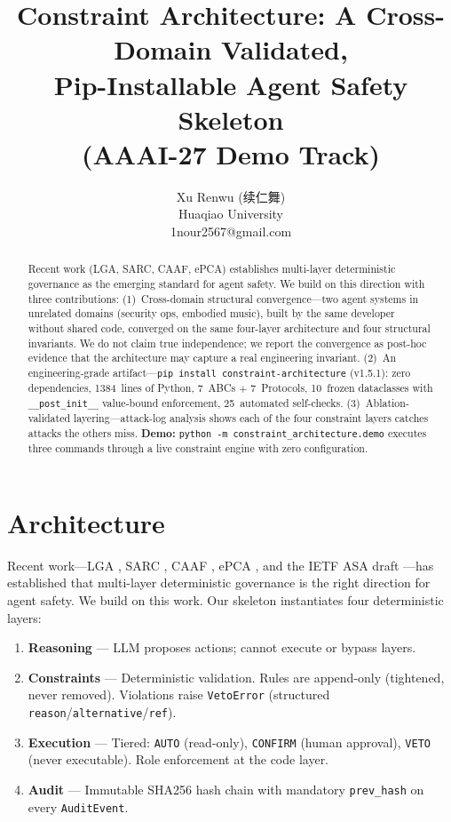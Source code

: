 \documentclass[letterpaper]{article} %
\title{Constraint Architecture: A Cross-Domain Validated,\\
       Pip-Installable Agent Safety Skeleton\\
       {\small (AAAI-27 Demo Track)}}
\author{
  Xu Renwu (续仁舞)\\
  Huaqiao University\\
  1nour2567@gmail.com
}
\begin{document}
\maketitle

\begin{abstract}
Recent work (LGA, SARC, CAAF, ePCA) establishes multi-layer deterministic
governance as the emerging standard for agent safety.  We build on this
direction with three contributions: (1)~Cross-domain structural convergence---two
agent systems in unrelated domains (security ops, embodied music), built by the
same developer without shared code, converged on the same four-layer
architecture and four structural invariants.  We do not claim true independence;
we report the convergence as post-hoc evidence that the architecture may capture
a real engineering invariant.  (2)~An engineering-grade artifact---\texttt{pip
install constraint-architecture} (v1.5.1): zero dependencies, 1384~lines of
Python, 7~ABCs + 7~Protocols, 10~frozen dataclasses with
\texttt{\_\_post\_init\_\_} value-bound enforcement, 25~automated self-checks.
(3)~Ablation-validated layering---attack-log analysis shows each of the four
constraint layers catches attacks the others miss.  \textbf{Demo:} \texttt{python
-m constraint\_architecture.demo} executes three commands through a live
constraint engine with zero configuration.
\end{abstract}

\section{Architecture}

Recent work---LGA \cite{ge2026}, SARC \cite{besanson2026}, CAAF \cite{li2026},
ePCA \cite{yang2026}, and the IETF ASA draft \cite{baysal2026}---has established
that multi-layer deterministic governance is the right direction for agent
safety.  We build on this work.  Our skeleton instantiates four deterministic
layers:

\begin{enumerate}
\item \textbf{Reasoning} --- LLM proposes actions; cannot execute or bypass layers.
\item \textbf{Constraints} --- Deterministic validation. Rules are append-only
      (tightened, never removed). Violations raise \texttt{VetoError}
      (structured \texttt{reason}/\texttt{alternative}/\texttt{ref}).
\item \textbf{Execution} --- Tiered: \texttt{AUTO} (read-only),
      \texttt{CONFIRM} (human approval), \texttt{VETO} (never executable).
      Role enforcement at the code layer.
\item \textbf{Audit} --- Immutable SHA256 hash chain with mandatory
      \texttt{prev\_hash} on every \texttt{AuditEvent}.
\end{enumerate}
\end{document}
